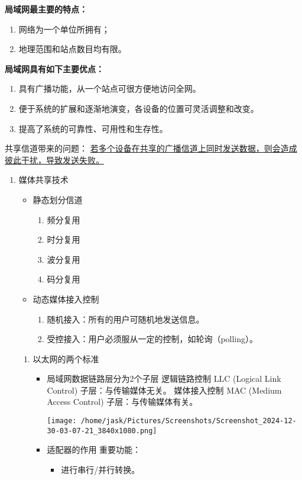 \documentclass[11pt]{article}
\begin{document}
\begin{enumerate}
\textbf{局域网最主要的特点：}
\begin{enumerate}
\item 网络为一个单位所拥有；
\item 地理范围和站点数目均有限。
\end{enumerate}
\textbf{局域网具有如下主要优点：}
\begin{enumerate}
\item 具有广播功能，从一个站点可很方便地访问全网。
\item 便于系统的扩展和逐渐地演变，各设备的位置可灵活调整和改变。
\item 提高了系统的可靠性、可用性和生存性。
\end{enumerate}

共享信道带来的问题：
\uline{若多个设备在共享的广播信道上同时发送数据，则会造成彼此干扰，导致发送失败。}
\begin{enumerate}
\item 媒体共享技术
\label{sec:org1f773d2}
\begin{itemize}
\item 静态划分信道
\begin{enumerate}
\item 频分复用
\item 时分复用
\item 波分复用
\item 码分复用
\end{enumerate}
\item 动态媒体接入控制
\begin{enumerate}
\item 随机接入：所有的用户可随机地发送信息。
\item 受控接入：用户必须服从一定的控制，如轮询（polling）。
\end{enumerate}
\end{itemize}
\begin{enumerate}
\item 以太网的两个标准
\label{sec:org9633d76}
\begin{itemize}
\item 局域网数据链路层分为2个子层
逻辑链路控制 LLC (Logical Link Control) 子层：与传输媒体无关。
媒体接入控制 MAC (Medium Access Control) 子层：与传输媒体有关。

\begin{center}
\texttt{[image: /home/jask/Pictures/Screenshots/Screenshot\_2024-12-30-03-07-21\_3840x1080.png]}
\end{center}

\item 适配器的作用
重要功能：
\begin{itemize}
\item 进行串行/并行转换。


\end{itemize}
\end{itemize}
\end{enumerate}
\end{enumerate}
\end{enumerate}
\end{document}
